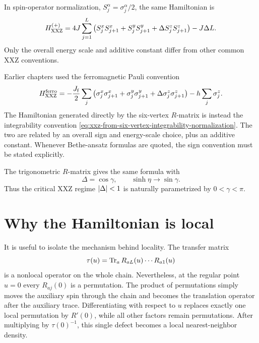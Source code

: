 In spin-operator normalization, $S_j^\alpha=\sigma_j^\alpha/2$, the same
Hamiltonian is
\begin{equation}
\label{eq:xxz-spin-operator-normalization-from-six-vertex}
    H_{\rm XXZ}^{(+)}
    =
    4J\sum_{j=1}^{L}
    \left(
        S_j^xS_{j+1}^x
        +S_j^yS_{j+1}^y
        +\Delta S_j^zS_{j+1}^z
    \right)
    -J\Delta L .
\end{equation}
Only the overall energy scale and additive constant differ from other common XXZ
conventions.

\begin{remark}
Earlier chapters used the ferromagnetic Pauli convention
\begin{equation}
    H_{\rm XXZ}^{\rm ferro}
    =
    -\frac{J_{\rm f}}{2}\sum_j
    \left(
        \sigma_j^x\sigma_{j+1}^x
        +\sigma_j^y\sigma_{j+1}^y
        +\Delta\sigma_j^z\sigma_{j+1}^z
    \right)
    -h\sum_j\sigma_j^z .
\end{equation}
The Hamiltonian generated directly by the six-vertex $R$-matrix is instead the
integrability convention \cref{eq:xxz-from-six-vertex-integrability-normalization}.
The two are related by an overall sign and energy-scale choice, plus an additive
constant.  Whenever Bethe-ansatz formulas are quoted, the sign convention must be
stated explicitly.
\end{remark}

The trigonometric $R$-matrix gives the same formula with
\begin{equation}
\label{eq:xxz-gapless-Delta-cos-gamma}
    \Delta=\cos\gamma,
    \qquad
    \sinh\eta\longrightarrow\sin\gamma .
\end{equation}
Thus the critical XXZ regime $\left|\Delta\right|<1$ is naturally parametrized by
$0<\gamma<\pi$.

\section{Why the Hamiltonian is local}
\label{sec:six-vertex-why-local}

It is useful to isolate the mechanism behind locality.  The transfer matrix
\begin{equation}
    \tau(u)=\operatorname{Tr}_a R_{aL}(u)\cdots R_{a1}(u)
\end{equation}
is a nonlocal operator on the whole chain.  Nevertheless, at the regular point
$u=0$ every $R_{aj}(0)$ is a permutation.  The product of permutations simply
moves the auxiliary spin through the chain and becomes the translation operator
after the auxiliary trace.  Differentiating with respect to $u$ replaces exactly
one local permutation by $R'(0)$, while all other factors remain permutations.
After multiplying by $\tau(0)^{-1}$, this single defect becomes a local
nearest-neighbor density.

